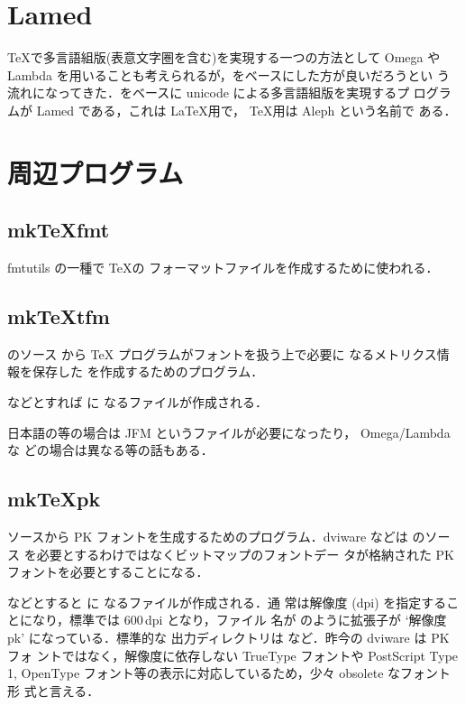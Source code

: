 \section{Lamed}

\TeX で多言語組版(表意文字圏を含む)を実現する一つの方法として Omega や
Lambda を用いることも考えられるが，\eTeX をベースにした方が良いだろうとい
う流れになってきた．\eTeX をベースに unicode による多言語組版を実現するプ
ログラムが Lamed である，これは \LaTeX 用で， \TeX 用は Aleph という名前で
ある．



\section{周辺プログラム}

\subsection{mkTeXfmt}

fmtutils の一種で \TeX の フォーマットファイルを作成するために使われる．

\subsection{mkTeXtfm}

\MF のソース  から TeX プログラムがフォントを扱う上で必要に
なるメトリクス情報を保存した  を作成するためのプログラム．
\begin{InTerm}
\end{InTerm}
などとすれば  に なるファイルが作成される．

日本語の等の場合は JFM というファイルが必要になったり， Omega/Lambda な
どの場合は異なる等の話もある．


\subsection{mkTeXpk}

\MF ソースから PK フォントを生成するためのプログラム．dviware などは \MF
のソース  を必要とするわけではなくビットマップのフォントデー
タが格納された PK フォントを必要とすることになる．
\begin{InTerm}
\end{InTerm}
などとすると  に  なるファイルが作成される．通
常は解像度 (dpi) を指定することになり，標準では 600\,dpi となり，ファイル
名が  のように拡張子が `解像度pk' になっている．標準的な
出力ディレクトリは  など．昨今の dviware は PK フォ
ントではなく，解像度に依存しない TrueType フォントや PostScript Type 1,
OpenType フォント等の表示に対応しているため，少々 obsolete なフォント形
式と言える．

